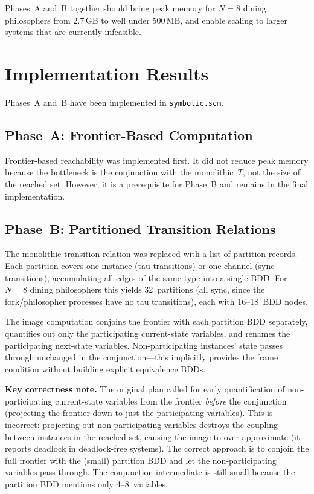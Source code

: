 \documentclass[11pt]{article}
\begin{document}
Phases~A and~B together should bring peak memory for $N = 8$ dining
philosophers from 2.7\,GB to well under 500\,MB, and enable scaling
to larger systems that are currently infeasible.

\section{Implementation Results}

Phases~A and~B have been implemented in \texttt{symbolic.scm}.

\subsection{Phase~A: Frontier-Based Computation}

Frontier-based reachability was implemented first.  It did not reduce
peak memory because the bottleneck is the conjunction with the
monolithic~$T$, not the size of the reached set.  However, it is a
prerequisite for Phase~B and remains in the final implementation.

\subsection{Phase~B: Partitioned Transition Relations}

The monolithic transition relation was replaced with a list of
partition records.  Each partition covers one instance (tau transitions)
or one channel (sync transitions), accumulating all edges of the same
type into a single BDD.  For $N = 8$ dining philosophers this yields
32~partitions (all sync, since the fork/philosopher processes have no
tau transitions), each with 16--18~BDD nodes.

The image computation conjoins the frontier with each partition BDD
separately, quantifies out only the participating current-state
variables, and renames the participating next-state variables.
Non-participating instances' state passes through unchanged in the
conjunction---this implicitly provides the frame condition without
building explicit equivalence BDDs.

\textbf{Key correctness note.}  The original plan called for
early quantification of non-participating current-state variables from
the frontier \emph{before} the conjunction (projecting the frontier
down to just the participating variables).  This is incorrect:
projecting out non-participating variables destroys the coupling
between instances in the reached set, causing the image to
over-approximate (it reports deadlock in deadlock-free systems).
The correct approach is to conjoin the full frontier with the
(small) partition BDD and let the non-participating variables pass
through.  The conjunction intermediate is still small because the
partition BDD mentions only 4--8~variables.
\end{document}
